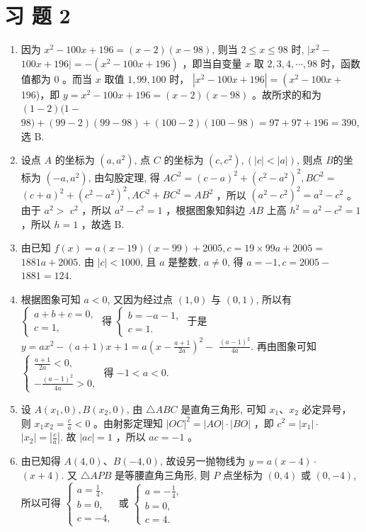 \documentclass[10pt]{article}
\begin{document}
\section*{习 题 2}
\begin{enumerate}
  \item 因为 $x^{2}-100 x+196=(x-2)(x-98)$, 则当 $2 \leqslant x \leqslant 98$ 时, $\mid x^{2}-$ $100 x+196 \mid=-\left(x^{2}-100 x+196\right)$ ，即当自变量 $x$ 取 $2,3,4, \cdots, 98$ 时，函数值都为 0 。而当 $x$ 取值 $1,99,100$ 时， $\left|x^{2}-100 x+196\right|=\left(x^{2}-100 x+\right.$ 196)，即 $y=x^{2}-100 x+196=(x-2)(x-98)$ 。故所求的和为 $(1-2)(1-$ $98)+(99-2)(99-98)+(100-2)(100-98)=97+97+196=390$, 选 B.
  \item 设点 $A$ 的坐标为 $\left(a, a^{2}\right)$, 点 $C$ 的坐标为 $\left(c, c^{2}\right),(|c|<|a|)$, 则点 $B$的坐标为 $\left(-a, a^{2}\right)$, 由勾股定理, 得 $A C^{2}=(c-a)^{2}+\left(c^{2}-a^{2}\right)^{2}, B C^{2}=$ $(c+a)^{2}+\left(c^{2}-a^{2}\right)^{2}, A C^{2}+B C^{2}=A B^{2}$ ，所以 $\left(a^{2}-c^{2}\right)^{2}=a^{2}-c^{2}$ 。由于 $a^{2}>$ $c^{2}$ ，所以 $a^{2}-c^{2}=1$ ，根据图象知斜边 $A B$ 上高 $h^{2}=a^{2}-c^{2}=1$ ，所以 $h=1$ ，故选 B.
  \item 由已知 $f(x)=a(x-19)(x-99)+2005, c=19 \times 99 a+2005=$ $1881 a+2005$. 由 $|c|<1000$, 且 $a$ 是整数, $a \neq 0$, 得 $a=-1, c=2005-$ $1881=124$.
  \item 根据图象可知 $a<0$, 又因为经过点 $(1,0)$ 与 $(0,1)$, 所以有\\
$\left\{\begin{array}{l}a+b+c=0, \\ c=1,\end{array}\right.$ 得 $\left\{\begin{array}{l}b=-a-1, \\ c=1 .\end{array}\right.$ 于是 $y=a x^{2}-(a+1) x+1=a\left(x-\frac{a+1}{2 a}\right)^{2}-$ $\frac{(a-1)^{2}}{4 a}$. 再由图象可知 $\left\{\begin{array}{l}\frac{a+1}{2 a}<0, \\ -\frac{(a-1)^{2}}{4 a}>0,\end{array}\right.$ 得 $-1<a<0$.
  \item 设 $A\left(x_{1}, 0\right), B\left(x_{2}, 0\right)$, 由 $\triangle A B C$ 是直角三角形, 可知 $x_{1} 、 x_{2}$ 必定异号，则 $x_{1} x_{2}=\frac{c}{a}<0$ 。由射影定理知 $|O C|^{2}=|A O| \cdot|B O|$ ，即 $c^{2}=\left|x_{1}\right| \cdot$ $\left|x_{2}\right|=\left|\frac{c}{a}\right|$. 故 $|a c|=1$ ，所以 $a c=-1$ 。
  \item 由已知得 $A(4,0) 、 B(-4,0)$, 故设另一抛物线为 $y=a(x-4) \cdot$ $(x+4)$. 又 $\triangle A P B$ 是等腰直角三角形, 则 $P$ 点坐标为 $(0,4)$ 或 $(0,-4)$, 所以可得 $\left\{\begin{array}{l}a=\frac{1}{4}, \\ b=0, \\ c=-4,\end{array}\right.$ 或 $\left\{\begin{array}{l}a=-\frac{1}{4}, \\ b=0, \\ c=4 .\end{array}\right.$

\end{enumerate}
\end{document}
